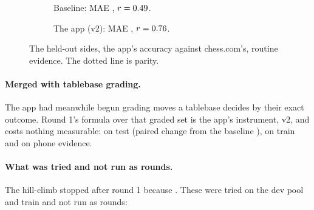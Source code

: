 \documentclass[11pt]{article}
\begin{document}
\begin{figure}[!htbp]
\centering
\begin{subfigure}{0.49\textwidth}\centering
{}
\caption{Baseline: MAE \BaseTestMae, $r = 0.49$.}
\end{subfigure}\hfill
\begin{subfigure}{0.49\textwidth}\centering
{}
\caption{The app (v2): MAE \TwoTestMae, $r = 0.76$.}
\end{subfigure}
\caption{The \ScatterSides{} held-out sides, the app's accuracy against chess.com's, routine
evidence. The dotted line is parity.}
\label{fig:scatter}
\end{figure}

\paragraph{Merged with tablebase grading.} The app had meanwhile begun grading moves a tablebase
decides by their exact outcome. Round 1's formula over that graded set is the app's instrument,
v2, and costs nothing measurable: \TwoTestMae{} on test (paired change from the baseline
\TwoVsBase), \TwoTrainMae{} on train and \PhoneTwoTestMae{} on phone evidence.

\paragraph{What was tried and not run as rounds.} The hill-climb stopped after round 1 because
\StopRule. These were tried on the dev pool and train and not run as rounds:
\NotRun
\end{document}
